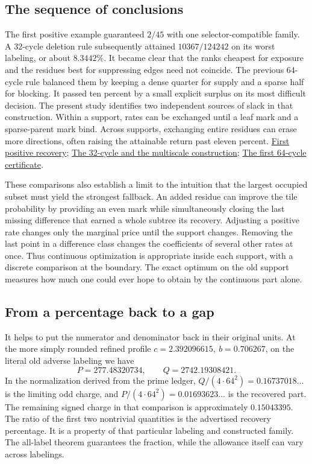 \documentclass[12pt,letterpaper]{article}
\begin{document}
\subsection{The sequence of conclusions}
The first positive example guaranteed \(2/45\) with one selector-compatible family. A 32-cycle deletion rule subsequently attained \(10367/124242\) on its worst labeling, or about \(8.3442\%\). It became clear that the ranks cheapest for exposure and the residues best for suppressing edges need not coincide. The previous 64-cycle rule balanced them by keeping a dense quarter for supply and a sparse half for blocking. It passed ten percent by a small explicit surplus on its most difficult decision. The present study identifies two independent sources of slack in that construction. Within a support, rates can be exchanged until a leaf mark and a sparse-parent mark bind. Across supports, exchanging entire residues can erase more directions, often raising the attainable return past eleven percent. \href{https://github.com/nousentllc/riemann-hypothesis/pull/12}{First positive recovery}; \href{https://github.com/nousentllc/riemann-hypothesis/pull/13}{The 32-cycle and the multiscale construction}; \href{https://github.com/nousentllc/riemann-hypothesis/pull/14}{The first 64-cycle certificate}.

These comparisons also establish a limit to the intuition that the largest occupied subset must yield the strongest fallback. An added residue can improve the tile probability by providing an even mark while simultaneously closing the last missing difference that earned a whole subtree its recovery. Adjusting a positive rate changes only the marginal price until the support changes. Removing the last point in a difference class changes the coefficients of several other rates at once. Thus continuous optimization is appropriate inside each support, with a discrete comparison at the boundary. The exact optimum on the old support measures how much one could ever hope to obtain by the continuous part alone.

\subsection{From a percentage back to a gap}
It helps to put the numerator and denominator back in their original units. At the more simply rounded refined profile \(c=2.392096615,\ b=0.706267\), on the literal old adverse labeling we have
\[
     P=277.48320734,\qquad Q=2742.19308421 .
\]
In the normalization derived from the prime ledger, \(Q/(4\cdot64^2)=0.16737018\ldots\) is the limiting odd charge, and \(P/(4\cdot64^2)=0.01693623\ldots\) is the recovered part. The remaining signed charge in that comparison is approximately \(0.15043395\). The ratio of the first two nontrivial quantities is the advertised recovery percentage. It is a property of that particular labeling and constructed family. The all-label theorem guarantees the fraction, while the allowance itself can vary across labelings.
\end{document}
